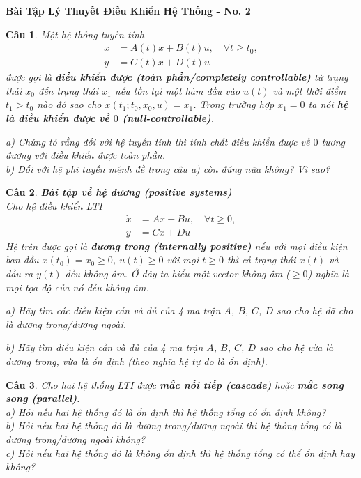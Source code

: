 \documentclass[11pt]{article}
\newtheorem{bt}{Câu}
\begin{document}



\begin{center}
	{\bf Bài Tập Lý Thuyết Điều Khiển Hệ Thống - No. 2}
\end{center}

\begin{bt}
Một hệ thống tuyến tính 
\begin{align}
	\dot{x} &= A(t)x + B(t)u, \quad \forall t \geq t_0, \\
	y &= C(t)x + D(t)u
\end{align}
được gọi là \textbf{điều khiển được (toàn phần/completely controllable)} từ trạng thái $x_0$ đến trạng thái $x_1$ nếu tồn tại một hàm đầu vào $u(t)$ và một thời điểm $t_1 > t_0$ nào đó sao cho $x(t_1;t_0,x_0,u) = x_1$. Trong trường hợp $x_1 = 0$ ta nói \textbf{hệ là điều khiển được về $0$ (null-controllable)}. 

\noindent  a) Chứng tỏ rằng đối với hệ tuyến tính thì tính chất điều khiển được về $0$ tương đương với điều khiển được toàn phần. \\
b) Đối với hệ phi tuyến mệnh đề trong câu a) còn đúng nữa không? Vì sao?
\end{bt}

\begin{bt} \textbf{Bài tập về hệ dương (positive systems)} \\
Cho hệ điều khiển LTI
\begin{align}
	\dot{x} &= Ax + Bu, \quad \forall t \geq 0, \\
	y &= Cx + Du
\end{align}
Hệ trên được gọi là \textbf{dương trong (internally positive)} nếu với mọi điều kiện ban đầu $x(t_0) = x_0 \geq 0$, $u(t) \geq 0$ với mọi $t\geq 0$ thì cả trạng thái $x(t)$ và đầu ra $y(t)$ đều không âm. Ở đây ta hiểu một vector không âm ($\geq 0$) nghĩa là mọi tọa độ của nó đều không âm. 

\noindent a) Hãy tìm các điều kiện cần và đủ của 4 ma trận $A$, $B$, $C$, $D$ sao cho hệ đã cho là dương trong/dương ngoài.

\noindent b) Hãy tìm điều kiện cần và đủ của 4 ma trận $A$, $B$, $C$, $D$ sao cho hệ vừa là dương trong, vừa là ổn định (theo nghĩa hệ tự do là ổn định).
\end{bt}   

\begin{bt}
Cho hai hệ thống LTI được \textbf{mắc nối tiếp (cascade)} hoặc \textbf{mắc song song (parallel)}. \\
a) Hỏi nếu hai hệ thống đó là ổn định thì hệ thống tổng có ổn định không? \\
b) Hỏi nếu hai hệ thống đó là dương trong/dương ngoài thì hệ thống tổng có là dương trong/dương ngoài không? \\
c) Hỏi nếu hai hệ thống đó là không ổn định thì hệ thống tổng có thể ổn định hay không?
\end{bt}
\end{document}
